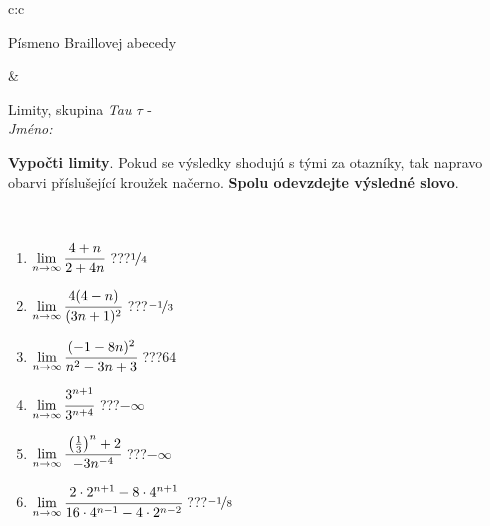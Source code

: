 \documentclass[10pt]{report}
\begin{document}
\begin{tabular}{c:c}
\begin{minipage}[c][104.5mm][t]{0.5\linewidth}
\begin{center}
\begin{minipage}{0.20\linewidth}
\begin{center}
{\small Písmeno Braillovej abecedy}
\end{center}
\end{minipage}
\end{center}
\end{minipage}
&
\begin{minipage}[c][104.5mm][t]{0.5\linewidth}
\begin{center}
\vspace{7mm}
{\huge Limity, skupina \textit{Tau $\tau$} -}\\[5mm]
\textit{Jméno:}\phantom{xxxxxxxxxxxxxxxxxxxxxxxxxxxxxxxxxxxxxxxxxxxxxxxxxxxxxxxxxxxxxxxxx}\\[5mm]
\begin{minipage}{0.95\linewidth}
\begin{center}
\textbf{Vypočti limity}. Pokud se výsledky shodujú s tými za otazníky, tak napravo\\obarvi příslušející kroužek načerno. \textbf{Spolu odevzdejte výsledné slovo}.
\end{center}
\end{minipage}
\\[1mm]
\begin{minipage}{0.79\linewidth}
\begin{center}
\begin{varwidth}{\linewidth}
\begin{enumerate}
\normalsize
\item $\lim\limits_{n\to\infty}\cfrac{4+n}{2+4n}$\quad \dotfill\; ???\;\dotfill \quad $\nicefrac{1}{4}$
\item $\lim\limits_{n\to\infty}\cfrac{4(4-n)}{(3n+1)^2}$\quad \dotfill\; ???\;\dotfill \quad $\nicefrac{-1}{3}$
\item $\lim\limits_{n\to\infty}\cfrac{(-1-8n)^2}{n^2-3n+3}$\quad \dotfill\; ???\;\dotfill \quad $64$
\item $\lim\limits_{n\to\infty}\cfrac{3^{n+1}}{3^{n+4}}$\quad \dotfill\; ???\;\dotfill \quad $-\infty$
\item $\lim\limits_{n\to\infty}\cfrac{\left(\frac{1}{3}\right)^n +2}{-3n^{-4}}$\quad \dotfill\; ???\;\dotfill \quad $-\infty$
\item $\lim\limits_{n\to\infty}\cfrac{2\cdot 2^{n+1}-8\cdot 4^{n+1}}{16\cdot 4^{n-1}-4\cdot 2^{n-2}}$\quad \dotfill\; ???\;\dotfill \quad $\nicefrac{-1}{8}$
\end{enumerate}
\end{varwidth}
\end{center}
\end{minipage}

\end{center}
\end{minipage}
\end{tabular}
\end{document}
